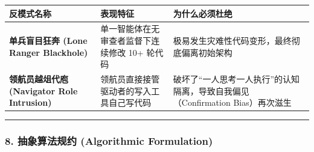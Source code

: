 {\def\LTcaptype{} %
\begin{longtable}[]{@{}
  >{\raggedright\arraybackslash}p{}
  >{\raggedright\arraybackslash}p{}
  >{\raggedright\arraybackslash}p{}@{}}
\toprule\noalign{}
\begin{minipage}[b]{\linewidth}\raggedright
反模式名称
\end{minipage} & \begin{minipage}[b]{\linewidth}\raggedright
表现特征
\end{minipage} & \begin{minipage}[b]{\linewidth}\raggedright
为什么必须杜绝
\end{minipage} \\
\midrule\noalign{}
\endhead
\bottomrule\noalign{}
\endlastfoot
\textbf{单兵盲目狂奔 (Lone Ranger Blackhole)} &
单一智能体在无审查者监督下连续修改 10+ 轮代码 &
极易发生灾难性代码变形，最终彻底偏离初始架构 \\
\textbf{领航员越俎代庖 (Navigator Role Intrusion)} &
领航员直接接管驱动者的写入工具自己写代码 &
破坏了``一人思考一人执行''的认知隔离，导致自我偏见（Confirmation
Bias）再次滋生 \\
\end{longtable}
}

\begin{center}\rule{0.5\linewidth}{0.5pt}\end{center}

\subsubsection{8. 抽象算法规约 (Algorithmic
Formulation)}\label{ux62bdux8c61ux7b97ux6cd5ux89c4ux7ea6-algorithmic-formulation-5}

